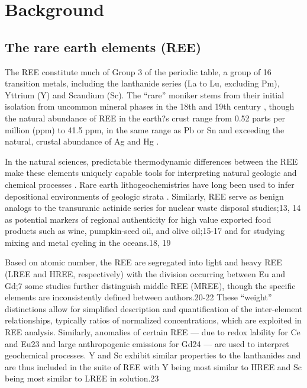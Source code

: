 \chapter{Background}\label{CH2}

\section{The rare earth elements (REE)}

The REE constitute much of Group 3 of the periodic table, a group of 16 transition metals, including the lanthanide series (La to Lu, excluding Pm), Yttrium (Y) and Scandium (Sc).
The ``rare'' moniker stems from their initial isolation from uncommon mineral phases in the 18th and 19th century \citep{CastorHedrick}, though the natural abundance of REE in the earth?s crust range from 0.52 parts per million (ppm) to 41.5 ppm, in the same range as Pb or Sn and exceeding the natural, crustal abundance of Ag and Hg \citep{CRC}.

In the natural sciences, predictable thermodynamic differences between the REE make these elements uniquely capable tools for interpreting natural geologic and chemical processes \citep{Murray_Geol_1990, Laveuf_Geoderma_2009}.
Rare earth lithogeochemistries have long been used to infer depositional environments of geologic strata \citep{Murray_Geol_1990, PAAS, Hanson_AREPS_1980}.
Similarly, REE serve as benign analogs to the transuranic actinide series for nuclear waste disposal studies;13, 14
as potential markers of regional authenticity for high value exported food products such as wine, pumpkin-seed oil, and olive oil;15-17
and for studying mixing and metal cycling in the oceans.18, 19

Based on atomic number, the REE are segregated into light and heavy REE (LREE and HREE, respectively) with the division occurring between Eu and Gd;7
some studies further distinguish middle REE (MREE), though the specific elements are inconsistently defined between authors.20-22
These ``weight'' distinctions allow for simplified description and quantification of the inter-element relationships, typically ratios of normalized concentrations, which are exploited in REE analysis.
Similarly, anomalies of certain REE --- due to redox lability for Ce and Eu23 and large anthropogenic emissions for Gd24 --- are used to interpret geochemical processes.
Y and Sc exhibit similar properties to the lanthanides and are thus included in the suite of REE with Y being most similar to HREE and Sc being most similar to LREE in solution.23 

